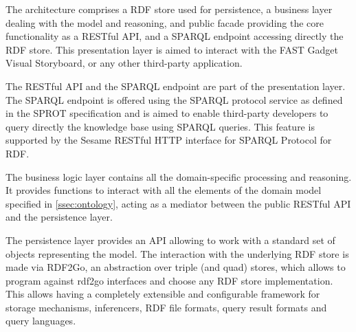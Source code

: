 The architecture comprises a RDF store used for persistence, a business layer dealing with the model and reasoning, and public facade providing the core functionality as a RESTful API, and a SPARQL endpoint accessing directly the RDF store. This presentation layer is aimed to interact with the FAST Gadget Visual Storyboard, or any other third-party application.

The RESTful API and the SPARQL endpoint are part of the presentation layer. The SPARQL endpoint is offered using the SPARQL protocol service as defined in the SPROT specification \cite{sprot} and is aimed to enable third-party developers to query directly the knowledge base using SPARQL queries. This feature is supported by the Sesame RESTful HTTP interface for SPARQL Protocol for RDF.

The business logic layer contains all the domain-specific processing and reasoning. It provides functions to interact with all the elements of the domain model specified in \ref{ssec:ontology},
acting as a mediator between the public RESTful API and the persistence layer.

The persistence layer provides an API allowing to work with a standard set of objects representing the model. The interaction with the underlying RDF store is made via RDF2Go, an abstraction over triple (and quad) stores, which allows to program against rdf2go interfaces and choose any RDF store implementation. This allows having a completely extensible and configurable framework for storage mechanisms, inferencers, RDF file formats, query result formats and query languages.




